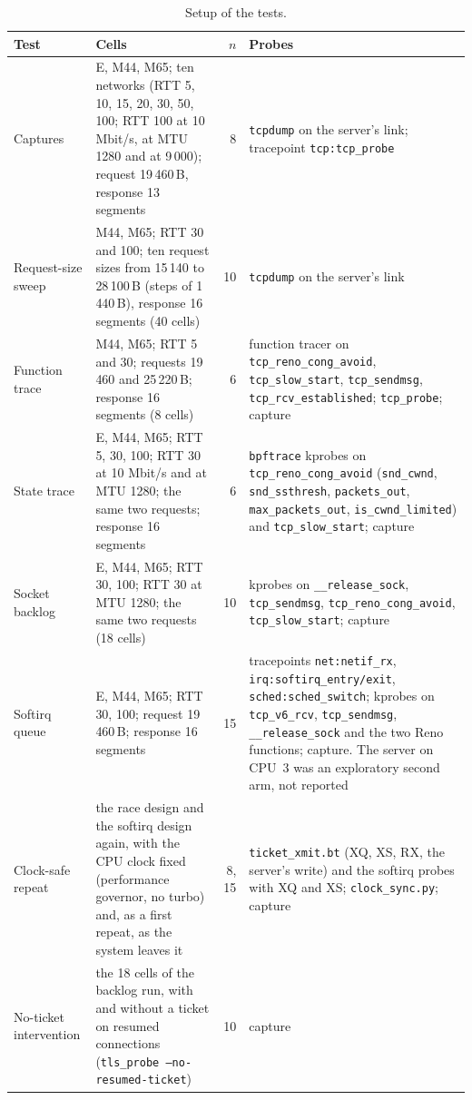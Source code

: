 \documentclass[9pt]{article}
\begin{document}
\begin{table}[h]
\caption{Setup of the tests.}
\label{tab:setup}
\centering\footnotesize\setlength{\tabcolsep}{4pt}
\begin{tabular}{@{}p{}p{}rp{}@{}}
\toprule
Test & Cells & $n$ & Probes\\
\midrule
Captures & E, M44, M65; ten networks (RTT 5, 10, 15, 20, 30, 50, 100; RTT 100 at 10 Mbit/s, at MTU 1280 and at 9\,000); request 19\,460\,B, response 13 segments & 8 & \texttt{tcpdump} on the server's link; tracepoint \texttt{tcp:tcp\_probe}\\
Request-size sweep & M44, M65; RTT 30 and 100; ten request sizes from 15\,140 to 28\,100\,B (steps of 1\,440\,B), response 16 segments (40 cells) & 10 & \texttt{tcpdump} on the server's link\\
Function trace & M44, M65; RTT 5 and 30; requests 19\,460 and 25\,220\,B; response 16 segments (8 cells) & 6 & function tracer on \texttt{tcp\_reno\_cong\_avoid}, \texttt{tcp\_slow\_start}, \texttt{tcp\_sendmsg}, \texttt{tcp\_rcv\_established}; \texttt{tcp\_probe}; capture\\
State trace & E, M44, M65; RTT 5, 30, 100; RTT 30 at 10 Mbit/s and at MTU 1280; the same two requests; response 16 segments & 6 & \texttt{bpftrace} kprobes on \texttt{tcp\_reno\_cong\_avoid} (\texttt{snd\_cwnd}, \texttt{snd\_ssthresh}, \texttt{packets\_out}, \texttt{max\_packets\_out}, \texttt{is\_cwnd\_limited}) and \texttt{tcp\_slow\_start}; capture\\
Socket backlog & E, M44, M65; RTT 30, 100; RTT 30 at MTU 1280; the same two requests (18 cells) & 10 & kprobes on \texttt{\_\_release\_sock}, \texttt{tcp\_sendmsg}, \texttt{tcp\_reno\_cong\_avoid}, \texttt{tcp\_slow\_start}; capture\\
Softirq queue & E, M44, M65; RTT 30, 100; request 19\,460\,B; response 16 segments & 15 & tracepoints \texttt{net:netif\_rx}, \texttt{irq:softirq\_entry/exit}, \texttt{sched:sched\_switch}; kprobes on \texttt{tcp\_v6\_rcv}, \texttt{tcp\_sendmsg}, \texttt{\_\_release\_sock} and the two Reno functions; capture. The server on CPU~3 was an exploratory second arm, not reported\\
Clock-safe repeat & the race design and the softirq design again, with the CPU clock fixed (performance governor, no turbo) and, as a first repeat, as the system leaves it & 8, 15 & \texttt{ticket\_xmit.bt} (XQ, XS, RX, the server's write) and the softirq probes with XQ and XS; \texttt{clock\_sync.py}; capture\\
No-ticket intervention & the 18 cells of the backlog run, with and without a ticket on resumed connections (\texttt{tls\_probe --no-resumed-ticket}) & 10 & capture\\
\bottomrule
\end{tabular}
\end{table}
\end{document}

